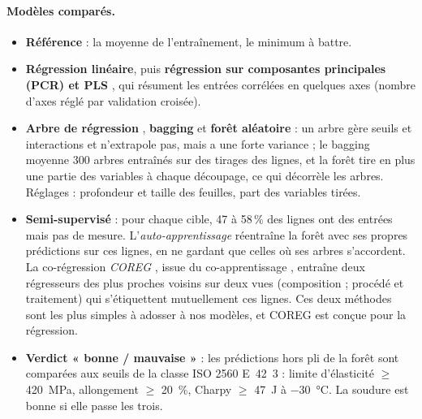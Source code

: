 \paragraph{Modèles comparés.}
\begin{itemize}
  \item \textbf{Référence} : la moyenne de l'entraînement, le minimum à battre.
  \item \textbf{Régression linéaire}, puis \textbf{régression sur composantes principales
    (PCR) et PLS} \cite{wold2001}, qui résument les entrées corrélées en quelques axes
    (nombre d'axes réglé par validation croisée).
  \item \textbf{Arbre de régression} \cite{breiman1984}, \textbf{bagging}
    \cite{breiman1996} et \textbf{forêt aléatoire} \cite{breiman2001} : un arbre gère
    seuils et interactions et n'extrapole pas, mais a une forte variance ; le bagging
    moyenne 300 arbres entraînés sur des tirages des lignes, et la forêt tire en plus
    une partie des variables à chaque découpage, ce qui décorrèle les arbres. Réglages :
    profondeur et taille des feuilles, part des variables tirées.
  \item \textbf{Semi-supervisé} \cite{zhu2009} : pour chaque cible, 47 à 58\,\% des lignes
    ont des entrées mais pas de mesure. L'\emph{auto-apprentissage} réentraîne la forêt
    avec ses propres prédictions sur ces lignes, en ne gardant que celles où ses arbres
    s'accordent. La co-régression \emph{COREG} \cite{zhou2005}, issue du co-apprentissage
    \cite{blum1998}, entraîne deux régresseurs des plus proches voisins sur deux vues
    (composition ; procédé et traitement) qui s'étiquettent mutuellement ces lignes. Ces
    deux méthodes sont les plus simples à adosser à nos modèles, et COREG est conçue
    pour la régression.
  \item \textbf{Verdict « bonne / mauvaise »} : les prédictions hors pli de la forêt sont
    comparées aux seuils de la classe ISO 2560 E~42~3 \cite{iso2560} : limite
    d'élasticité $\geq$ \SI{420}{\mega\pascal}, allongement $\geq$ \SI{20}{\percent},
    Charpy $\geq$ \SI{47}{\joule} à \SI{-30}{\celsius}. La soudure est bonne si elle
    passe les trois.
\end{itemize}
